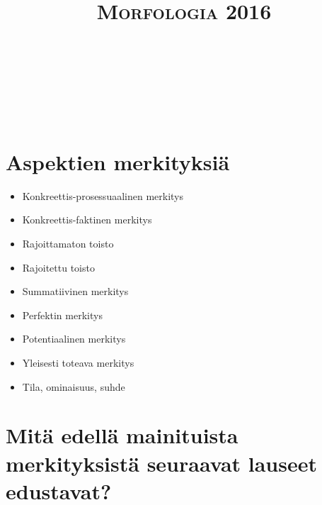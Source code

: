 \documentclass[paper=a4, fontsize=11pt]{scrartcl}
\title{	
\normalfont \normalsize 
\textsc{Morfologia 2016} \\ [25pt] 
\horrule{0.5pt} \\[0.4cm] 
\huge  \\ 
\horrule{2pt} \\[0.5cm] 
}
\date{}
\begin{document}
\section*{Aspektien merkityksiä}

\begin{itemize}
    \item Konkreettis-prosessuaalinen merkitys
    \item Konkreettis-faktinen merkitys
    \item Rajoittamaton toisto
    \item Rajoitettu toisto
    \item Summatiivinen merkitys
    \item Perfektin merkitys
    \item Potentiaalinen merkitys
    \item Yleisesti toteava merkitys
    \item Tila, ominaisuus, suhde
\end{itemize}

\onehalfspacing


\section{Mitä edellä mainituista merkityksistä seuraavat lauseet edustavat?}
\end{document}
